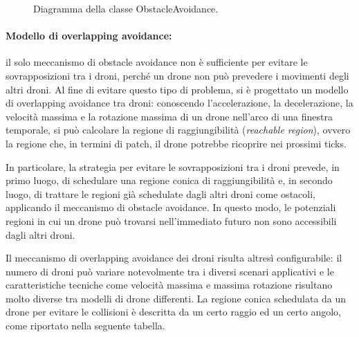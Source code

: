 \begin{figure}[H] 
    \captionsetup{justification=centering, margin=2cm, font=footnotesize}
    \begin{center}
    \end{center}
    \caption[short]{Diagramma della classe ObstacleAvoidance.}
    \label{classe_obstacle}
\end{figure}

\paragraph{Modello di overlapping avoidance:} il solo meccanismo di obstacle avoidance non è sufficiente per evitare le sovrapposizioni tra i droni, perché un drone non può prevedere i movimenti degli altri droni. 
Al fine di evitare questo tipo di problema, si è progettato un modello di overlapping avoidance tra droni: conoscendo l’accelerazione, la decelerazione, la velocità massima e la rotazione massima di un drone nell’arco di una finestra temporale, si può calcolare la regione di raggiungibilità (\textit{reachable region}), ovvero la regione che, in termini di patch, il drone potrebbe ricoprire nei prossimi ticks. 

In particolare, la strategia per evitare le sovrapposizioni tra i droni prevede, in primo luogo, di schedulare una regione conica di raggiungibilità e, in secondo luogo, di trattare le regioni già schedulate dagli altri droni come ostacoli, applicando il meccanismo di obstacle avoidance. 
In questo modo, le potenziali regioni in cui un drone può trovarsi nell’immediato futuro non sono accessibili dagli altri droni. 

Il meccanismo di overlapping avoidance dei droni risulta altresì configurabile: il numero di droni può variare notevolmente tra i diversi scenari applicativi e le caratteristiche tecniche come velocità massima e massima rotazione risultano molto diverse tra modelli di drone differenti. 
La regione conica schedulata da un drone per evitare le collisioni è descritta da un certo raggio ed un certo angolo, come riportato nella seguente tabella.

